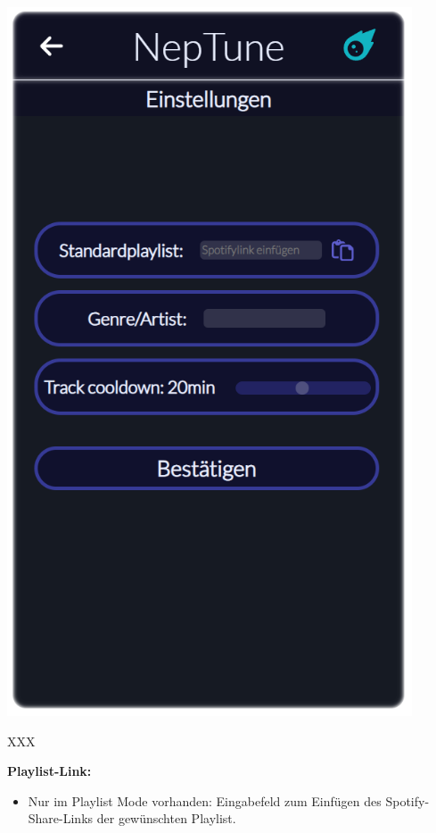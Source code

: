 \documentclass[oneside, ngerman]{sdqtechreport}
\begin{document}
\begin{minipage}{0.5\textwidth}
    \hypertarget{hostModeSettingsView}{}
    \includegraphics[width=0.9\textwidth]{LATEX/Pflichtenheft/GraphicDesigns/hostModusSettingsPage.png}
\end{minipage} 
\hfill
\begin{minipage}{0.5\textwidth}
    XXX
\end{minipage}

\textbf{Playlist-Link:}
\begin{itemize}
    \item Nur im Playlist Mode vorhanden: Eingabefeld zum Einfügen des Spotify-Share-Links der gewünschten Playlist.
\end{itemize}
\end{document}

